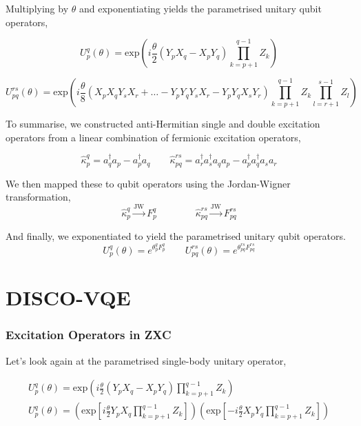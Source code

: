 Multiplying by $\theta$ and exponentiating yields the parametrised unitary qubit operators,

\begin{equation*}
    U^q_p (\theta) =
    \text{exp} \left( i
    \frac{\theta}{2} (Y_p X_q - X_p Y_q) \prod_{k=p+1}^{q-1} Z_k \right)
\end{equation*}

\begin{equation*}
    U^{rs}_{pq} (\theta) = \text{exp} \left( i \frac{\theta}{8} (
    X_p X_q Y_s X_r
    + \dots -
    Y_p Y_q Y_s X_r -
    Y_p Y_q X_s Y_r )
    \prod_{k=p+1}^{q-1} Z_k
    \prod_{l=r+1}^{s-1} Z_l
    \right)
\end{equation*}

To summarise, we constructed anti-Hermitian single and double excitation operators from a linear combination of fermionic excitation operators,

\begin{equation*}
    \hat\kappa_p^q = a_q^\dagger a_p - a_p^\dagger a_q \qquad
    \hat\kappa_{pq}^{rs} =
    a_r^\dagger a_s^\dagger a_q a_p - a_p^\dagger a_q^\dagger a_s a_r
\end{equation*}\smallskip

We then mapped these to qubit operators using the Jordan-Wigner transformation,
\begin{equation*}
    \hat\kappa_p^q \xrightarrow{\text{JW}} F_p^q \qquad\qquad
    \hat\kappa_{pq}^{rs} \xrightarrow{\text{JW}} F_{pq}^{rs}
\end{equation*}

And finally, we exponentiated to yield the parametrised unitary qubit operators.
\begin{equation*}
    U^q_p (\theta) = e^{\theta^q_p F_p^q} \qquad
    U^{rs}_{pq}(\theta) = e^{\theta_{pq}^{rs} F_{pq}^{rs}}
\end{equation*}

\section{DISCO-VQE}

\subsubsection{Excitation Operators in ZXC}

Let's look again at the parametrised single-body unitary operator,

\begin{equation*}
\begin{gathered}
    U^q_p (\theta) =
    \text{exp} \left( i
    \frac{\theta}{2} (Y_p X_q - X_p Y_q) \prod_{k=p+1}^{q-1} Z_k \right) \\
    U^q_p (\theta) =
    \left( \text{exp} \left[
    i \frac{\theta}{2} Y_p X_q \prod_{k=p+1}^{q-1} Z_k \right] \right)
    \left( \text{exp} \left[ -
    i \frac{\theta}{2} X_p Y_q \prod_{k=p+1}^{q-1} Z_k \right] \right)
\end{gathered}
\end{equation*}

